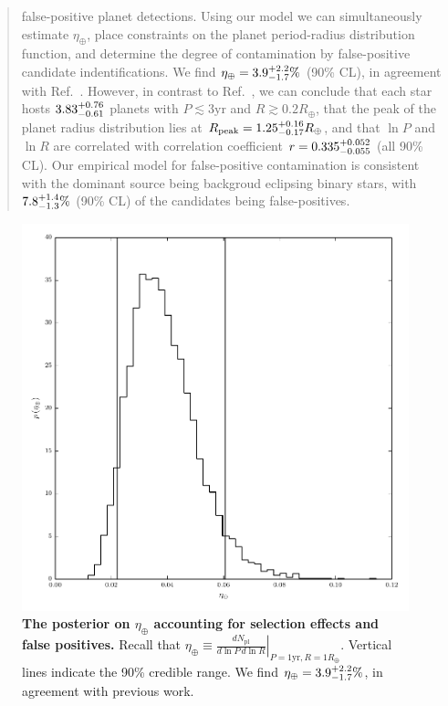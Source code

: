 \documentclass{nature}
\newcommand{\etaearth}{\eta_\oplus}
\newcommand{\Rpeak}{R_\mathrm{peak}}
\newcommand{\REarth}{R_\oplus}
\begin{document}
\begin{abstract}
  false-positive planet detections.  Using our model we can
  simultaneously estimate $\etaearth$, place constraints on the planet
  period-radius distribution function, and determine the degree of
  contamination by false-positive candidate indentifications.  We find
  $\etaearth = \earange$ (90\% CL), in agreement with
  Ref.\ \cite{2013PNAS..11019273P}.  However, in contrast to
  Ref.\ \cite{2013PNAS..11019273P}, we can conclude that each star
  hosts $3.83_{-0.61}^{+0.76}$ planets with $P \lesssim 3 \mathrm{yr}$
  and $R \gtrsim 0.2 \REarth$, that the peak of the planet radius
  distribution lies at $\Rpeak = \rpeakrange \REarth$, and
  that $\ln P$ and $\ln R$ are correlated with correlation coefficient
  $r = 0.335_{-0.055}^{+0.052}$ (all 90\% CL).  Our empirical model
  for false-positive contamination is consistent with the dominant
  source being backgroud eclipsing binary
  stars\cite{2013ApJ...766...81F}, with $7.8_{-1.3}^{+1.4}\%$ (90\%
  CL) of the candidates being false-positives.
\end{abstract}

\begin{figure}
  \includegraphics[width=\columnwidth]{eta-earth}
  \caption{\label{fig:eta-earth} \textbf{The posterior on $\etaearth$
      accounting for selection effects and false positives.}  Recall
    that $\etaearth \equiv \left. \frac{dN_\mathrm{pl}}{d\ln P \,d \ln
      R} \right|_{P = 1\mathrm{yr}, R=1\REarth}$.  Vertical lines
    indicate the 90\% credible range.  We find $\etaearth = \earange$,
    in agreement with previous work\cite{2013PNAS..11019273P}.}
\end{figure}
\end{document}
